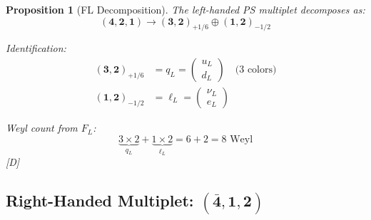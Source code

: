 \documentclass[11pt,a4paper]{article}
\newtheorem{proposition}[theorem]{Proposition}
\newcommand{\tagD}{\textcolor{blue!70!black}{[D]}}
\begin{document}
\begin{proposition}[FL Decomposition]
\label{prop:FL-decomp}
The left-handed PS multiplet decomposes as:
\begin{equation}
\label{eq:FL-decomp}
(\mathbf{4}, \mathbf{2}, \mathbf{1}) \to (\mathbf{3}, \mathbf{2})_{+1/6} \oplus (\mathbf{1}, \mathbf{2})_{-1/2}
\end{equation}

Identification:
\begin{align}
\label{eq:qL-ident}
(\mathbf{3}, \mathbf{2})_{+1/6} &= q_L = \begin{pmatrix} u_L \\ d_L \end{pmatrix} \quad \text{(3 colors)} \\
\label{eq:lL-ident}
(\mathbf{1}, \mathbf{2})_{-1/2} &= \ell_L = \begin{pmatrix} \nu_L \\ e_L \end{pmatrix}
\end{align}

Weyl count from $F_L$:
\begin{equation}
\label{eq:FL-weyl}
\underbrace{3 \times 2}_{q_L} + \underbrace{1 \times 2}_{\ell_L} = 6 + 2 = 8 \text{ Weyl}
\end{equation}
\tagD
\end{proposition}

\subsection{Right-Handed Multiplet: $(\bar{\mathbf{4}}, \mathbf{1}, \mathbf{2})$}
\end{document}
